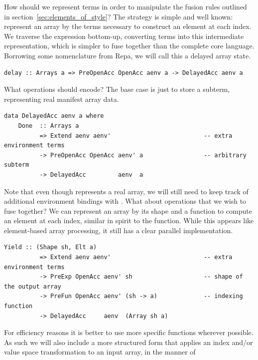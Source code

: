 How should we represent terms in order to manipulate the fusion rules outlined
in section~\ref{sec:elements_of_style}? The strategy is simple and well known:
represent an array by the terms necessary to construct an element at each index.
We traverse the expression bottom-up, converting terms into this intermediate
representation, which is simpler to fuse together than the complete core
language. Borrowing some nomenclature from Repa, we will call this a delayed
array state.
%
%
\begin{lstlisting}[style=haskell,numbers=none]
delay :: Arrays a => PreOpenAcc OpenAcc aenv a -> DelayedAcc aenv a
\end{lstlisting}
%
What operations should  encode? The base case is just to
store a subterm, representing real manifest array data.
%
\begin{lstlisting}[style=haskell]
data DelayedAcc aenv a where
    Done  :: Arrays a
          => Extend aenv aenv'                          -- extra environment terms
          -> PreOpenAcc OpenAcc aenv' a                 -- arbitrary subterm
          -> DelayedAcc         aenv  a
\end{lstlisting}
%
Note that even though  represents a real array, we will still need
to keep track of additional environment bindings with .
What about operations that we wish to fuse together? We can represent an array
by its shape and a function to compute an element at each index, similar in
spirit to the  function. While this appears like element-based
array processing, it still has a clear parallel implementation.
%
\begin{lstlisting}[style=haskell,firstnumber=last]
    Yield :: (Shape sh, Elt a)
          => Extend aenv aenv'                          -- extra environment terms
          -> PreExp OpenAcc aenv' sh                    -- shape of the output array
          -> PreFun OpenAcc aenv' (sh -> a)             -- indexing function
          -> DelayedAcc     aenv  (Array sh a)
\end{lstlisting}
%
For efficiency reasons it is better to use more specific functions wherever
possible. As such we will also include a more structured form that applies an
index and/or value space transformation to an input array, in the manner of
